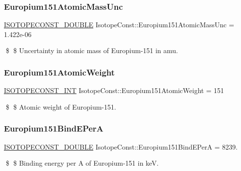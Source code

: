\subsubsection{\texorpdfstring{Europium151\+Atomic\+Mass\+Unc}{Europium151AtomicMassUnc}}
{\footnotesize\ttfamily \mbox{\hyperlink{group___isotope_const-_macros_ga8f45a7272ce02c0b4c65c44636ed719a}{I\+S\+O\+T\+O\+P\+E\+C\+O\+N\+S\+T\+\_\+\+D\+O\+U\+B\+LE}} Isotope\+Const\+::\+Europium151\+Atomic\+Mass\+Unc = 1.\+422e-\/06}

\$ \$ Uncertainty in atomic mass of Europium-\/151 in amu. \mbox{\label{group___isotope_const-_europium-_eu151_ga7bb4f8439ac76aca6c9e7d9068a93aff}} 
\subsubsection{\texorpdfstring{Europium151\+Atomic\+Weight}{Europium151AtomicWeight}}
{\footnotesize\ttfamily \mbox{\hyperlink{group___isotope_const-_macros_ga5f18360b3e99483a35c32d789e62621c}{I\+S\+O\+T\+O\+P\+E\+C\+O\+N\+S\+T\+\_\+\+I\+NT}} Isotope\+Const\+::\+Europium151\+Atomic\+Weight = 151}

\$ \$ Atomic weight of Europium-\/151. \mbox{\label{group___isotope_const-_europium-_eu151_ga796e9c9b1050e67b73e77a8b544e707f}} 
\subsubsection{\texorpdfstring{Europium151\+Bind\+E\+PerA}{Europium151BindEPerA}}
{\footnotesize\ttfamily \mbox{\hyperlink{group___isotope_const-_macros_ga8f45a7272ce02c0b4c65c44636ed719a}{I\+S\+O\+T\+O\+P\+E\+C\+O\+N\+S\+T\+\_\+\+D\+O\+U\+B\+LE}} Isotope\+Const\+::\+Europium151\+Bind\+E\+PerA = 8239.}

\$ \$ Binding energy per A of Europium-\/151 in keV. \mbox{\label{group___isotope_const-_europium-_eu151_ga8283a9dc846870a9593e216a471aaae7}} 
